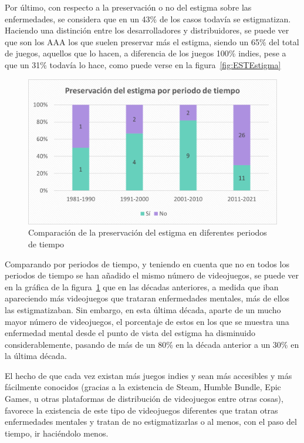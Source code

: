 \documentclass[12pt, a4paper,twoside,titlepage]{book}
\begin{document}
Por último, con respecto a la preservación o no del estigma sobre las enfermedades, se considera que en un 43\% de los casos todavía se estigmatizan. Haciendo una distinción entre los desarrolladores y distribuidores, se puede ver que son los AAA los que suelen preservar más el estigma, siendo un 65\% del total de juegos, aquellos que lo hacen, a diferencia de los juegos 100\% indies, pese a que un 31\% todavía lo hace, como puede verse en la figura~\ref{fig:ESTEstigma}

\begin{figure}
    \centering
    \includegraphics[width=.8\linewidth]{Graficas estudio/G18; EstigmaTiempo.png}
    \caption{Comparación de la preservación del estigma en diferentes periodos de tiempo}
    \label{fig:ESTEstigmatiempo}
\end{figure}

Comparando por periodos de tiempo, y teniendo en cuenta que no en todos los periodos de tiempo se han añadido el mismo número de videojuegos, se puede ver en la gráfica de la figura~\ref{fig:ESTEstigmatiempo} que en las décadas anteriores, a medida que iban apareciendo más videojuegos que trataran enfermedades mentales, más de ellos las estigmatizaban. Sin embargo, en esta última década, aparte de un mucho mayor número de videojuegos, el porcentaje de estos en los que se muestra una enfermedad mental desde el punto de vista del estigma ha disminuido considerablemente, pasando de más de un 80\% en la década anterior a un 30\% en la última década. 

El hecho de que cada vez existan más juegos indies y sean más accesibles y más fácilmente conocidos (gracias a la existencia de Steam, Humble Bundle, Epic Games, u otras plataformas de distribución de videojuegos entre otras cosas), favorece la existencia de este tipo de videojuegos diferentes que tratan otras enfermedades mentales y tratan de no estigmatizarlas o al menos, con el paso del tiempo, ir haciéndolo menos. 
\end{document}
